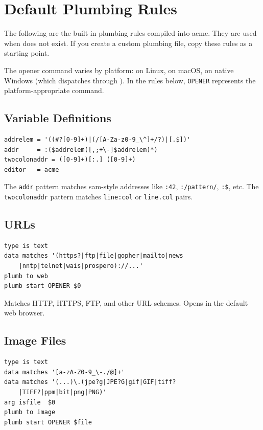 \chapter{Default Plumbing Rules}
\label{app:plumbing}


The following are the built-in plumbing rules compiled into acme.  They
are used when  does not exist.  If
you create a custom plumbing file, copy these rules as a starting point.

The opener command varies by platform:  on Linux,
 on macOS,  on native Windows (which dispatches
through ).  In the rules below, \texttt{OPENER}
represents the platform-appropriate command.

\section{Variable Definitions}

\begin{lstlisting}[frame=none,basicstyle=\small\ttfamily]
addrelem = '((#?[0-9]+)|(/[A-Za-z0-9_\^]+/?)|[.$])'
addr     = :($addrelem([,;+\-]$addrelem)*)
twocolonaddr = ([0-9]+)[:.] ([0-9]+)
editor   = acme
\end{lstlisting}

The \texttt{addr} pattern matches sam-style addresses like \texttt{:42},
\texttt{:/pattern/}, \texttt{:\$}, etc.  The \texttt{twocolonaddr}
pattern matches \texttt{line:col} or \texttt{line.col} pairs.

\section{URLs}

\begin{lstlisting}[frame=none,basicstyle=\small\ttfamily]
type is text
data matches '(https?|ftp|file|gopher|mailto|news
    |nntp|telnet|wais|prospero)://...'
plumb to web
plumb start OPENER $0
\end{lstlisting}

Matches HTTP, HTTPS, FTP, and other URL schemes.  Opens in the
default web browser.

\section{Image Files}

\begin{lstlisting}[frame=none,basicstyle=\small\ttfamily]
type is text
data matches '[a-zA-Z0-9_\-./@]+'
data matches '(...)\.(jpe?g|JPE?G|gif|GIF|tiff?
    |TIFF?|ppm|bit|png|PNG)'
arg isfile  $0
plumb to image
plumb start OPENER $file
\end{lstlisting}

